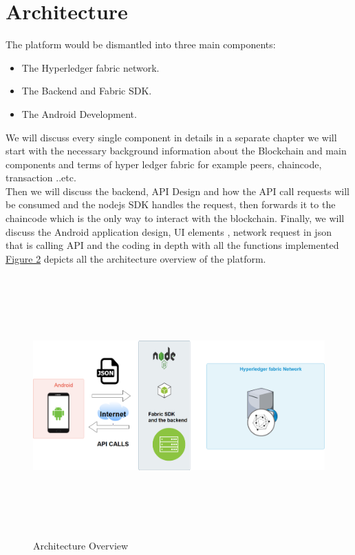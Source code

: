 \section{Architecture}
The platform would be dismantled into three main components: 
\begin{itemize}
  \item The Hyperledger fabric network.
  \item The Backend and Fabric SDK. 
  \item The Android Development. 
\end{itemize}

We will discuss every single component in details in a separate chapter we will start with the necessary background information about the Blockchain and main components and terms of hyper ledger fabric for example peers, chaincode, transaction ..etc. \\ Then we will discuss the backend, API Design  and how the API call requests will be consumed and the nodejs SDK handles the request, then forwards it to the chaincode which is the only way to interact with the blockchain.
Finally, we will discuss the Android application design, UI elements , network request in json that is calling API and the coding in depth with all the functions implemented \hyperref[fig:architecture]{Figure 2} depicts all the architecture overview of the platform. 
\begin{figure}[H]
	\includegraphics[width=15cm,height=10cm]{images/architecture.png}
	\caption{Architecture Overview}
	\label{fig:architecture}
	\end{figure}

      

 


      